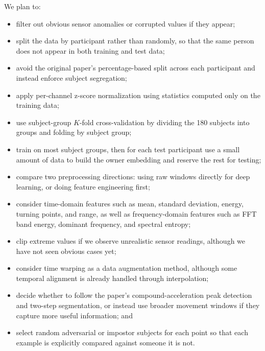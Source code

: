 \documentclass[11pt]{article}
\begin{document}
We plan to:
\begin{itemize}
    \item filter out obvious sensor anomalies or corrupted values if they appear;
    \item split the data by participant rather than randomly, so that the same person does not appear in both training and test data;
    \item avoid the original paper's percentage-based split across each participant and instead enforce subject segregation;
    \item apply per-channel z-score normalization using statistics computed only on the training data;
    \item use subject-group $K$-fold cross-validation by dividing the 180 subjects into groups and folding by subject group;
    \item train on most subject groups, then for each test participant use a small amount of data to build the owner embedding and reserve the rest for testing;
    \item compare two preprocessing directions: using raw windows directly for deep learning, or doing feature engineering first;
    \item consider time-domain features such as mean, standard deviation, energy, turning points, and range, as well as frequency-domain features such as FFT band energy, dominant frequency, and spectral entropy;
    \item clip extreme values if we observe unrealistic sensor readings, although we have not seen obvious cases yet;
    \item consider time warping as a data augmentation method, although some temporal alignment is already handled through interpolation;
    \item decide whether to follow the paper's compound-acceleration peak detection and two-step segmentation, or instead use broader movement windows if they capture more useful information; and
    \item select random adversarial or impostor subjects for each point so that each example is explicitly compared against someone it is not.
\end{itemize}
\end{document}
